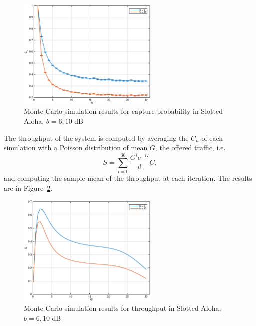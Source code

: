 \documentclass[10pt]{article}
\begin{document}
\begin{figure}[h!]
  \centering
  \includegraphics[width = 0.6\textwidth]{aloha_monte}
  \caption{Monte Carlo simulation results for capture probability in Slotted Aloha, $b = 6, 10$ dB}
  \label{fig:aloha_monte}
\end{figure}

The throughput of the system is computed by averaging the $C_n$ of each simulation with a Poisson distribution of mean $G$, the offered traffic, i.e.
\begin{equation}
  S = \sum_{i = 0}^{30} \frac{G^{i} e^{-G}}{i!} C_i 
  \label{eq:aloha_S}
\end{equation}
and computing the sample mean of the throughput at each iteration. The results are in Figure~\ref{fig:aloha_monte_S}.

\begin{figure}[h!]
  \centering
  \includegraphics[width = 0.6\textwidth]{aloha_monte_S}
  \caption{Monte Carlo simulation results for throughput in Slotted Aloha, $b = 6, 10$ dB}
  \label{fig:aloha_monte_S}
\end{figure}
\end{document}
